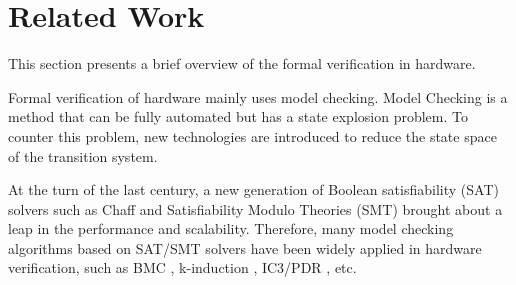\documentclass[conference]{IEEEtran}
\theoremstyle{definition}
\begin{document}


\section{Related Work}
This section presents a brief overview of the formal verification in hardware.

Formal verification of hardware mainly uses model checking.
Model Checking is a method that can be fully automated but has a state explosion problem. To counter this problem, new technologies are introduced to reduce the state space of the transition system.

At the turn of the last century, a new generation of Boolean satisfiability (SAT) solvers such as Chaff \cite{MoskewiczMZZM01} and Satisfiability Modulo Theories (SMT) \cite{barrett2018satisfiability} brought about a leap in the performance and scalability. 
Therefore, many model checking algorithms based on SAT/SMT solvers have been widely applied in hardware verification, such as BMC \cite{BiereCCZ99}, k-induction \cite{tinelli2012smt}, IC3/PDR \cite{Bradley11}, etc.
\end{document}

